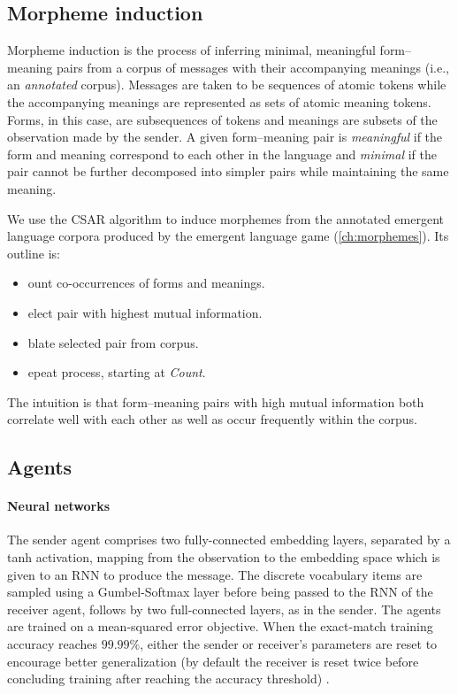 \subsection{Morpheme induction}
Morpheme induction is the process of inferring minimal, meaningful form--meaning pairs from a corpus of messages with their accompanying meanings (i.e., an \emph{annotated} corpus).
Messages are taken to be sequences of atomic tokens while the accompanying meanings are represented as sets of atomic meaning tokens.
Forms, in this case, are subsequences of tokens and meanings are subsets of the observation made by the sender.
A given form--meaning pair is \emph{meaningful} if the form and meaning correspond to each other in the language and \emph{minimal} if the pair cannot be further decomposed into simpler pairs while maintaining the same meaning.

We use the CSAR algorithm to induce morphemes from the annotated emergent language corpora produced by the emergent language game (\cref{ch:morphemes}).
Its outline is:
\begin{itemize}[nosep,labelsep=2pt]
  \item[\textbf{C}]ount co-occurrences of forms and meanings.
  \item[\textbf{S}]elect pair with highest mutual information.
  \item[\textbf{A}]blate selected pair from corpus.
  \item[\textbf{R}]epeat process, starting at \emph{Count}.
\end{itemize}
The intuition is that form--meaning pairs with high mutual information both correlate well with each other as well as occur frequently within the corpus.


\subsection{Agents}
\paragraph{Neural networks}
The sender agent comprises two fully-connected embedding layers, separated by a tanh activation, mapping from the observation to the embedding space which is given to an RNN to produce the message.
The discrete vocabulary items are sampled using a Gumbel-Softmax layer \citep{maddison2017concrete,jang2017categorical} before being passed to the RNN of the receiver agent, follows by two full-connected layers, as in the sender.
The agents are trained on a mean-squared error objective.
When the exact-match training accuracy reaches $99.99\%$, either the sender or receiver's parameters are reset to encourage better generalization (by default the receiver is reset twice before concluding training after reaching the accuracy threshold) \citep{li2019ease}.

